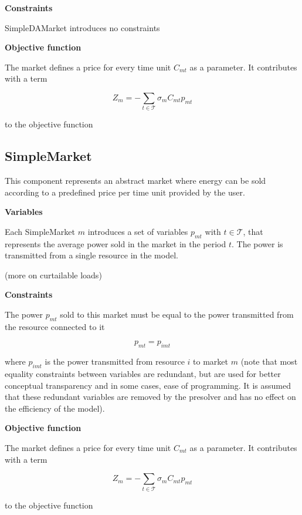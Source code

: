 \documentclass[]{report}
\newcommand{\timesteps}{\mathcal{T}}
\newcommand{\sign}{\sigma}
\begin{document}
\textbf{Constraints}

SimpleDAMarket introduces no constraints

\textbf{Objective function}

The market defines a price for every time unit $C_{mt}$ as a parameter. It contributes with a term

\begin{equation}
    Z_m = -\sum_{t \in \timesteps} \sign_m C_{mt}p_{mt}
\end{equation}

to the objective function

\newpage
\subsection{SimpleMarket}
This component represents an abstract market where energy can be sold according to a predefined price per time unit provided by the user.

\textbf{Variables}

Each SimpleMarket $m$ introduces a set of variables $p_{mt}$ with $t \in \timesteps$, that represents the average power sold in the market in the period $t$. The power is transmitted from a single resource in the model. 

(more on curtailable loads)

\textbf{Constraints}

The power $p_{mt}$ sold to this market must be equal to the power transmitted from the resource connected to it

\begin{equation}
    p_{mt} = p_{imt}
\end{equation}

where $p_{imt}$ is the power transmitted from resource $i$ to market $m$ (note that most equality constraints between variables are redundant, but are used for better conceptual transparency and in some cases, ease of programming. It is assumed that these redundant variables are removed by the presolver and has no effect on the efficiency of the model).

\textbf{Objective function}

The market defines a price for every time unit $C_{mt}$ as a parameter. It contributes with a term

\begin{equation}
    Z_m = -\sum_{t \in \timesteps} \sign_m C_{mt}p_{mt}
\end{equation}

to the objective function
\end{document}

